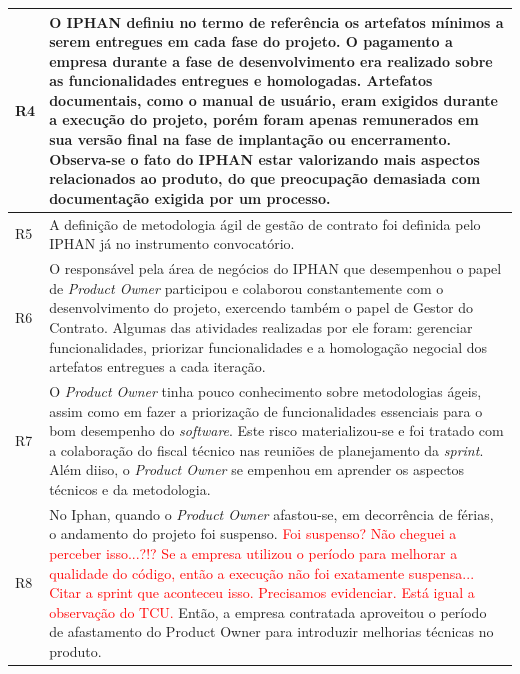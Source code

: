 \begin{longtable}{|p{2cm}|p{13cm}|}
R4                                                                &  O IPHAN definiu no termo de referência os artefatos mínimos a serem entregues em cada fase do projeto. O pagamento a empresa durante a fase de desenvolvimento era realizado sobre as funcionalidades entregues e homologadas. Artefatos documentais, como o manual de usuário, eram exigidos durante a execução do projeto, porém foram apenas remunerados em sua versão final na fase de implantação ou encerramento. Observa-se o fato do IPHAN estar valorizando mais aspectos relacionados ao produto, do que preocupação demasiada com documentação exigida por um processo.             \\ \hline
R5                                                                & A definição de metodologia ágil de gestão de contrato foi definida pelo IPHAN já no instrumento convocatório.            \\ \hline
R6                                                                & O responsável pela área de negócios do IPHAN que desempenhou o papel de \textit{Product Owner} participou e colaborou constantemente com o desenvolvimento do projeto, exercendo também o papel de Gestor do Contrato. Algumas das atividades realizadas por ele foram: gerenciar funcionalidades, priorizar funcionalidades e a homologação negocial dos artefatos entregues a cada iteração. \\ \hline
R7                                                                & O \textit{Product Owner} tinha pouco conhecimento sobre metodologias ágeis, assim como em fazer a priorização de funcionalidades essenciais para o bom desempenho do \textit{software}. Este risco materializou-se e foi tratado com a colaboração do fiscal técnico nas reuniões de planejamento da \textit{sprint}. Além diiso, o \textit{Product Owner} se empenhou em aprender os aspectos técnicos e da metodologia.               \\ \hline
R8                                                                & No Iphan, quando o \textit{Product Owner} afastou-se, em decorrência de férias, o andamento do projeto foi suspenso. \textcolor{red}{Foi suspenso? Não cheguei a perceber isso...?!? Se a empresa utilizou o período para melhorar a qualidade do código, então a execução não foi exatamente suspensa... Citar a sprint que aconteceu isso. Precisamos evidenciar. Está igual a observação do TCU.} Então, a empresa contratada aproveitou o período de afastamento do Product Owner para introduzir melhorias técnicas no produto.       \\ \hline

\end{longtable}
